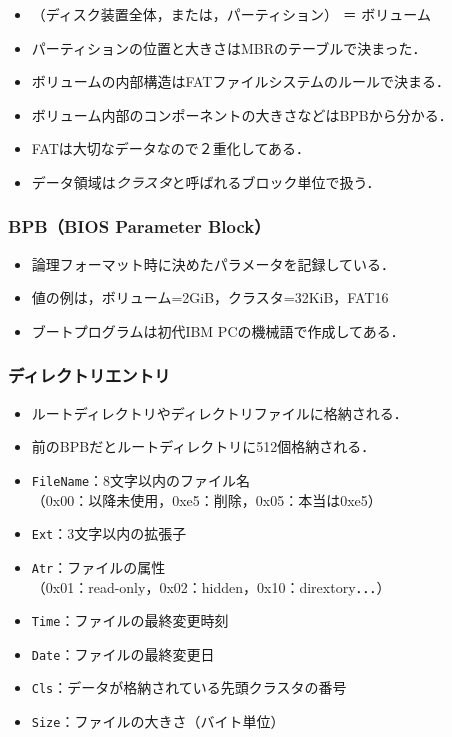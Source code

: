 \documentclass{beamer}                   %
\begin{document}
\begin{frame}
\begin{itemize}
  \item （ディスク装置全体，または，パーティション） ＝ ボリューム
  \item パーティションの位置と大きさはMBRのテーブルで決まった．
  \item ボリュームの内部構造はFATファイルシステムのルールで決まる．
  \item ボリューム内部のコンポーネントの大きさなどはBPBから分かる．
  \item FATは大切なデータなので２重化してある．
  \item データ領域は\emph{クラスタ}と呼ばれるブロック単位で扱う．
  \end{itemize}
  \vfill
\end{frame}

\begin{frame}
  \frametitle{BPB（BIOS Parameter Block）}
  \begin{itemize}
  \item 論理フォーマット時に決めたパラメータを記録している．
  \item 値の例は，ボリューム=2GiB，クラスタ=32KiB，FAT16
  \item ブートプログラムは初代IBM PCの機械語で作成してある．
  \end{itemize}
  \vfill
\end{frame}

\begin{frame}
  \frametitle{ディレクトリエントリ}
  \begin{itemize}
  \item ルートディレクトリやディレクトリファイルに格納される．
  \item 前のBPBだとルートディレクトリに512個格納される．
  \item \texttt{FileName}：8文字以内のファイル名\\
    （0x00：以降未使用，0xe5：削除，0x05：本当は0xe5）
  \item \texttt{Ext}：3文字以内の拡張子
  \item \texttt{Atr}：ファイルの属性\\
    （0x01：read-only，0x02：hidden，0x10：dirextory．．．）
  \item \texttt{Time}：ファイルの最終変更時刻
  \item \texttt{Date}：ファイルの最終変更日
  \item \texttt{Cls}：データが格納されている先頭クラスタの番号
  \item \texttt{Size}：ファイルの大きさ（バイト単位）
  \end{itemize}
\end{frame}
\end{document}

